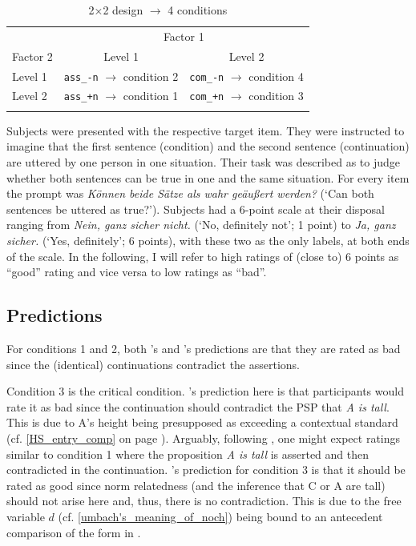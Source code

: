 \documentclass[output=paper]{langsci/langscibook}
\begin{document}
\begin{table}
\begin{tabular}{lcc}
\lsptoprule
         & \multicolumn{2}{c}{Factor 1}\\\cmidrule(lr){2-3}
Factor 2 & Level 1 & Level 2\\
\midrule
Level 1 & \texttt{ass\_-n} $\rightarrow$ condition 2 & \texttt{com\_-n} $\rightarrow$ condition 4 \\
Level 2 & \texttt{ass\_+n} $\rightarrow$ condition 1 & \texttt{com\_+n} $\rightarrow$ condition 3 \\
\lspbottomrule
\end{tabular}
\caption{2×2 design $\rightarrow$ 4 conditions}
\label{tab:factors_levels_conds}
\end{table}

\pagebreak Subjects were presented with the respective target item. They were instructed to imagine that the first sentence (condition) and the second sentence (continuation) are uttered by one person in one situation. Their task was described as to judge whether both sentences can be true in one and the same situation. For every item the prompt was \textit{Können beide Sätze als wahr geäußert werden?} (`Can both sentences be uttered as true?'). Subjects had a 6-point scale at their disposal ranging from \textit{Nein, ganz sicher nicht.} (`No, definitely not'; 1 point) to \textit{Ja, ganz sicher.} (`Yes, definitely'; 6 points), with these two as the only labels, at both ends of the scale. In the following, I will refer to high ratings of (close to) 6 points as ``good'' rating and vice versa to low ratings as ``bad''.

\subsection{Predictions}
For conditions 1 and 2, both \citeauthor{Hofstetter2013}'s and \citeauthor{umbach2009a_comp}'s predictions are that they are rated as bad since the (identical) continuations contradict the assertions.

Condition 3 is the critical condition. \citeauthor{Hofstetter2013}'s prediction here is that participants would rate it as bad since the continuation should contradict the PSP that \textit{A is tall}. This is due to A's height being presupposed as exceeding a contextual standard (cf. \ref{HS_entry_comp} on page \pageref{HS_entry_comp}). Arguably, following \citeauthor{Hofstetter2013}, one might expect ratings similar to condition 1 where the proposition \textit{A is tall} is asserted and then contradicted in the continuation. \citeauthor{umbach2009a_comp}'s prediction for condition 3 is that it should be rated as good since norm relatedness (and the inference that C or A are tall) should not arise here and, thus, there is no contradiction. This is due to the free variable $d$ (cf. \ref{umbach's_meaning_of_noch}) being bound to an antecedent comparison of the form in .
\end{document}
